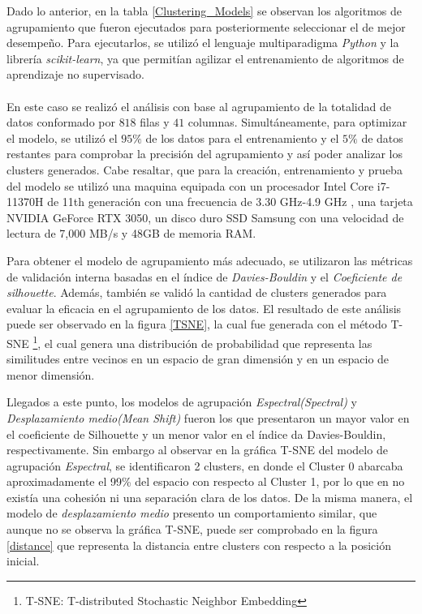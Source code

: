 Dado lo anterior, en la tabla \ref{Clustering_Models} se observan los algoritmos de agrupamiento que fueron ejecutados para posteriormente seleccionar el de mejor desempeño. Para ejecutarlos, se utilizó el lenguaje multiparadigma \textit{Python} y la librería \textit{scikit-learn}, ya que permitían agilizar el entrenamiento de algoritmos de aprendizaje no supervisado.
\\\\
En este caso se realizó el análisis con base al agrupamiento de la totalidad de datos conformado por $818$ filas y $41$ columnas. Simultáneamente, para optimizar el modelo, se utilizó el $95\%$ de los datos para el entrenamiento y el $5\%$ de datos restantes para comprobar la precisión del agrupamiento y así poder analizar los clusters generados. Cabe resaltar, que para la creación, entrenamiento y prueba del modelo se utilizó una maquina equipada con un procesador Intel Core i7-11370H de 11th generación con una frecuencia de 3.30 GHz-4.9 GHz , una tarjeta NVIDIA GeForce RTX 3050, un disco duro SSD Samsung con una velocidad de lectura de 7,000 MB/s y 48GB de memoria RAM. 

Para obtener el modelo de agrupamiento más adecuado, se utilizaron las métricas de validación interna basadas en el índice de \textit{Davies-Bouldin} y el \textit{Coeficiente de silhouette}. Además, también se validó la cantidad de clusters generados para evaluar la eficacia en el agrupamiento de los datos. El resultado de este análisis puede ser observado en la figura \ref{TSNE}, la cual fue generada con el método T-SNE \footnote{T-SNE: T-distributed Stochastic Neighbor Embedding}, el cual genera una distribución de probabilidad que representa las similitudes entre vecinos en un espacio de gran dimensión y en un espacio de menor dimensión. 

Llegados a este punto, los modelos de agrupación \textit{Espectral(Spectral)} y \textit{Desplazamiento medio(Mean Shift)}  fueron los que presentaron un mayor valor en el coeficiente de Silhouette y un menor valor en el índice da Davies-Bouldin, respectivamente. Sin embargo al observar en la gráfica T-SNE del modelo de agrupación \textit{Espectral}, se identificaron 2 clusters, en donde el Cluster 0 abarcaba aproximadamente el 99\% del espacio con respecto al Cluster 1, por lo que en no existía una cohesión ni una separación clara de los datos. De la misma manera, el modelo de \textit{desplazamiento medio} presento un comportamiento similar, que aunque no se observa la gráfica T-SNE, puede ser comprobado en la figura \ref{distance} que representa la distancia entre clusters con respecto a la posición inicial.

